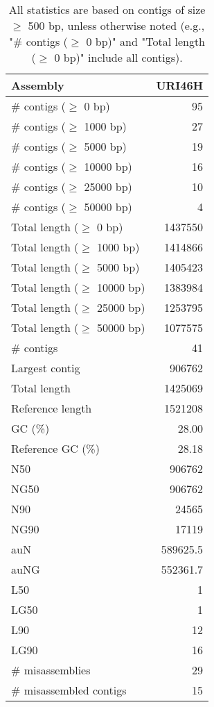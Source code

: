 \documentclass[12pt,a4paper]{article}
\begin{document}
\begin{table}[ht]
\begin{center}
\caption{All statistics are based on contigs of size $\geq$ 500 bp, unless otherwise noted (e.g., "\# contigs ($\geq$ 0 bp)" and "Total length ($\geq$ 0 bp)" include all contigs).}
\begin{tabular}{|l*{1}{|r}|}
\hline
Assembly & URI46H \\ \hline
\# contigs ($\geq$ 0 bp) & 95 \\ \hline
\# contigs ($\geq$ 1000 bp) & 27 \\ \hline
\# contigs ($\geq$ 5000 bp) & 19 \\ \hline
\# contigs ($\geq$ 10000 bp) & 16 \\ \hline
\# contigs ($\geq$ 25000 bp) & 10 \\ \hline
\# contigs ($\geq$ 50000 bp) & 4 \\ \hline
Total length ($\geq$ 0 bp) & 1437550 \\ \hline
Total length ($\geq$ 1000 bp) & 1414866 \\ \hline
Total length ($\geq$ 5000 bp) & 1405423 \\ \hline
Total length ($\geq$ 10000 bp) & 1383984 \\ \hline
Total length ($\geq$ 25000 bp) & 1253795 \\ \hline
Total length ($\geq$ 50000 bp) & 1077575 \\ \hline
\# contigs & 41 \\ \hline
Largest contig & 906762 \\ \hline
Total length & 1425069 \\ \hline
Reference length & 1521208 \\ \hline
GC (\%) & 28.00 \\ \hline
Reference GC (\%) & 28.18 \\ \hline
N50 & 906762 \\ \hline
NG50 & 906762 \\ \hline
N90 & 24565 \\ \hline
NG90 & 17119 \\ \hline
auN & 589625.5 \\ \hline
auNG & 552361.7 \\ \hline
L50 & 1 \\ \hline
LG50 & 1 \\ \hline
L90 & 12 \\ \hline
LG90 & 16 \\ \hline
\# misassemblies & 29 \\ \hline
\# misassembled contigs & 15 \\ \hline

\end{tabular}
\end{center}
\end{table}
\end{document}
